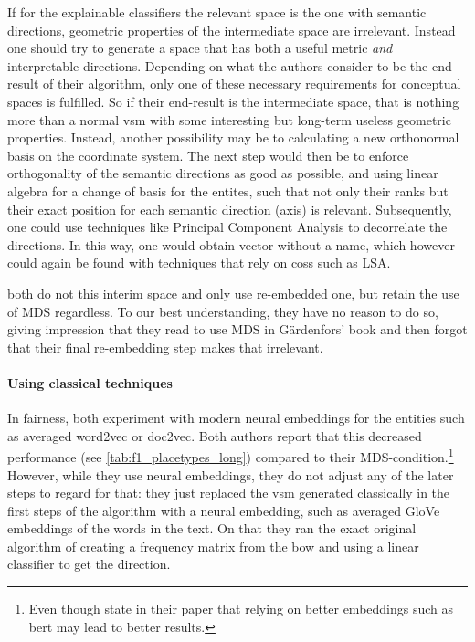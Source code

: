 If for the explainable classifiers the relevant space is the one with semantic directions, geometric properties of the intermediate space are irrelevant. Instead one should try to generate a space that has both a useful metric \textit{and} interpretable directions. Depending on what the authors consider to be the end result of their algorithm, only one of these necessary requirements for conceptual spaces is fulfilled. So if their end-result is the intermediate space, that is nothing more than a normal \gls{vsm} with some interesting but long-term useless geometric properties. Instead, another possibility may be to calculating a new orthonormal basis on the coordinate system. The next step would then be to enforce orthogonality of the semantic directions as good as possible, and using linear algebra for a change of basis for the entites, such that not only their ranks but their exact position for each semantic direction (axis) is relevant. Subsequently, one could use techniques like Principal Component Analysis to decorrelate the directions. In this way, one would obtain vector without a name, which however could again be found with techniques that rely on \glspl{cos} such as LSA.

\textcite{Ager2018,Alshaikh2020} both do not this interim space and only use re-embedded one, but retain the use of MDS regardless. To our best understanding, they have no reason to do so, giving impression that they read to use MDS in Gärdenfors' book and then forgot that their final re-embedding step makes that irrelevant. 

\paragraph{Using classical techniques}

In fairness, \cite{Ager2018,Alshaikh2020} both experiment with modern neural embeddings for the entities such as averaged \gls{word2vec} or \gls{doc2vec}. Both authors report that this decreased performance (see \autoref{tab:f1_placetypes_long}) compared to their MDS-condition.\footnote{Even though \textcite{Alshaikh2020} state in their paper that relying on better embeddings such as \gls{bert} \cite{Devlin2019} may lead to better results.} However, while they use neural embeddings, they do not adjust any of the later steps to regard for that: they just replaced the \gls{vsm} generated classically in the first steps of the algorithm with a neural embedding, such as averaged GloVe embeddings \cite{pennington2014glove} of the words in the text. On that they ran the exact original algorithm of creating a frequency matrix from the \gls{bow} and using a linear classifier to get the direction. 

